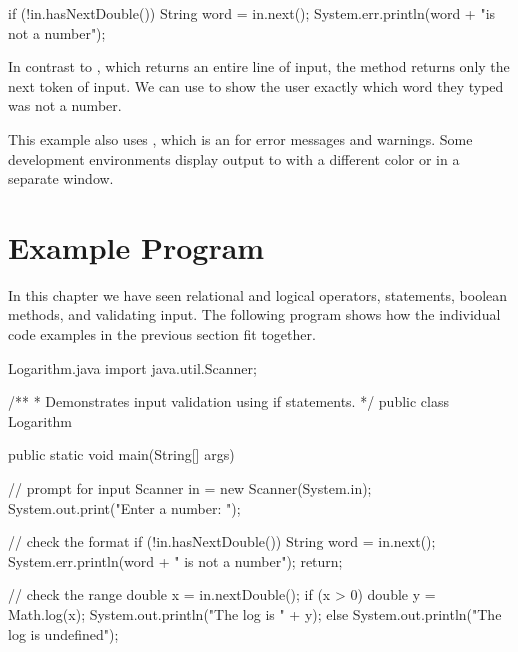 \begin{code}
if (!in.hasNextDouble()) {
    String word = in.next();
    System.err.println(word + "is not a number");
}
\end{code}


In contrast to , which returns an entire line of input, the  method returns only the next token of input.
We can use  to show the user exactly which word they typed was not a number.


This example also uses , which is an  for error messages and warnings.
Some development environments display output to  with a different color or in a separate window.



\section{Example Program}

In this chapter we have seen relational and logical operators,  statements, boolean methods, and validating input.
The following program shows how the individual code examples in the previous section fit together.


\begin{trinket}{Logarithm.java}
import java.util.Scanner;

/**
 * Demonstrates input validation using if statements.
 */
public class Logarithm {

    public static void main(String[] args) {

        // prompt for input
        Scanner in = new Scanner(System.in);
        System.out.print("Enter a number: ");

        // check the format
        if (!in.hasNextDouble()) {
            String word = in.next();
            System.err.println(word + " is not a number");
            return;
        }

        // check the range
        double x = in.nextDouble();
        if (x > 0) {
            double y = Math.log(x);
            System.out.println("The log is " + y);
        } else {
            System.out.println("The log is undefined");
        }
    }
}
\end{trinket}

